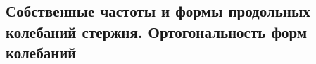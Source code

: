 

\subsection{Собственные частоты и формы продольных колебаний стержня. Ортогональность форм колебаний}



